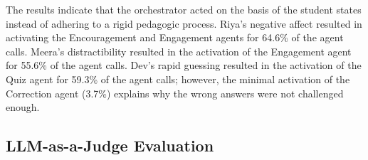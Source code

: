 \documentclass[conference, letterpaper]{IEEEtran}
\begin{document}
\begin{table}[!t]
\centering
\caption{Agent activation distribution showing adaptive orchestration across personas.}
\label{tab:agents_dist}
\scriptsize
{}
\end{table}

The results indicate that the orchestrator acted on the basis of the student states instead of adhering to a rigid pedagogic process. Riya's negative affect resulted in activating the Encouragement and Engagement agents for 64.6\% of the agent calls. Meera's distractibility resulted in the activation of the Engagement agent for 55.6\% of the agent calls. Dev's rapid guessing resulted in the activation of the Quiz agent for 59.3\% of the agent calls; however, the minimal activation of the Correction agent (3.7\%) explains why the wrong answers were not challenged enough.

\subsection{LLM-as-a-Judge Evaluation}
\end{document}
